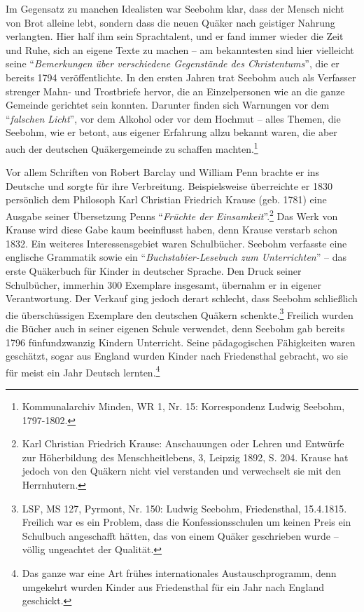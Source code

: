 \medskip

Im Gegensatz zu manchen Idealisten war Seebohm klar, dass der Mensch nicht von
Brot alleine lebt, sondern dass die neuen Quäker nach geistiger Nahrung
verlangten. Hier half ihm sein Sprachtalent, und er fand immer wieder die Zeit
und Ruhe, sich an eigene Texte zu machen -- am bekanntesten sind hier vielleicht
seine "`\textit{Bemerkungen über verschiedene Gegenstände des Christentums}"',
die er bereits 1794 veröffentlichte. In den ersten Jahren trat Seebohm auch als
Verfasser strenger Mahn- und Trostbriefe hervor, die an Einzelpersonen wie an
die ganze Gemeinde gerichtet sein konnten. Darunter finden sich Warnungen vor
dem "`\textit{falschen Licht}"', vor dem Alkohol oder vor dem
Hochmut -- alles Themen, die Seebohm, wie er betont, aus eigener
Erfahrung allzu bekannt waren, die aber auch der deutschen Quäkergemeinde zu
schaffen machten.\footnote{Kommunalarchiv Minden, WR 1, Nr. 15: Korrespondenz
Ludwig Seebohm,
1797-1802.}

\medskip

Vor allem Schriften von Robert Barclay und
William Penn brachte er ins Deutsche und sorgte
für ihre Verbreitung. Beispielsweise überreichte er 1830 persönlich dem
Philosoph Karl Christian Friedrich Krause (geb. 1781) eine Ausgabe seiner Übersetzung Penns "`\textit{Früchte
der Einsamkeit}"'.\footnote{Karl Christian Friedrich Krause: Anschauungen oder
Lehren und Entwürfe zur
Höherbildung des Menschheitlebens, 3, Leipzig 1892, S. 204. Krause hat jedoch
von den Quäkern nicht viel verstanden und verwechselt sie mit den Herrnhutern.}
Das Werk von Krause wird diese Gabe kaum beeinflusst haben, denn Krause verstarb
schon 1832. Ein weiteres Interessensgebiet waren Schulbücher. Seebohm verfasste
eine englische Grammatik sowie ein "`\textit{Buchstabier-Lesebuch zum
Unterrichten}"' -- das erste Quäkerbuch für Kinder in
deutscher Sprache. Den Druck seiner Schulbücher, immerhin 300
Exemplare insgesamt, übernahm er in eigener Verantwortung. Der Verkauf ging
jedoch derart schlecht, dass Seebohm schließlich die überschüssigen Exemplare
den deutschen Quäkern schenkte.\footnote{LSF, MS 127, Pyrmont, Nr. 150: Ludwig
Seebohm, Friedensthal, 15.4.1815.
Freilich war es ein Problem, dass die Konfessionsschulen um keinen Preis ein
Schulbuch angeschafft hätten, das von einem Quäker geschrieben wurde -- völlig
ungeachtet der Qualität.} Freilich wurden die Bücher auch in seiner
eigenen Schule verwendet, denn Seebohm gab bereits 1796
fünfundzwanzig Kindern Unterricht. Seine pädagogischen Fähigkeiten waren
geschätzt, sogar aus England wurden Kinder nach
Friedensthal gebracht, wo sie für meist ein Jahr Deutsch lernten.\footnote{Das
ganze war eine Art frühes internationales Austauschprogramm, denn
umgekehrt wurden Kinder aus Friedensthal für ein Jahr nach England geschickt.}

